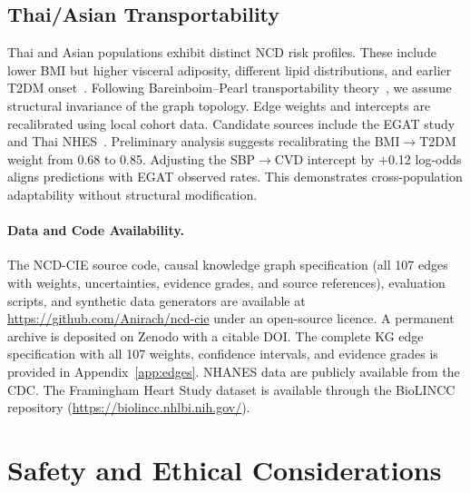 \documentclass[runningheads]{llncs}
\begin{document}
\subsection{Thai/Asian Transportability}\label{sec:thai}

Thai and Asian populations exhibit distinct NCD risk profiles.
These include lower BMI but higher visceral adiposity, different lipid
distributions, and earlier T2DM
onset~\cite{aekplakorn2011thai}.
Following Bareinboim--Pearl transportability
theory~\cite{bareinboim2016causal}, we assume structural invariance
of the graph topology.
Edge weights and intercepts are recalibrated using local cohort data.
Candidate sources include the EGAT
study~\cite{sritara2003egat} and Thai NHES~\cite{aekplakorn2011thai}.
Preliminary analysis suggests recalibrating the BMI$\rightarrow$T2DM
weight from 0.68 to 0.85.
Adjusting the SBP$\rightarrow$CVD intercept by $+$0.12 log-odds
aligns predictions with EGAT observed rates.
This demonstrates cross-population adaptability without structural
modification.

\paragraph{Data and Code Availability.}
The NCD-CIE source code, causal knowledge graph specification
(all 107 edges with weights, uncertainties, evidence grades, and
source references), evaluation scripts, and synthetic data generators
are available at \url{https://github.com/Anirach/ncd-cie}
under an open-source licence.
A permanent archive is deposited on Zenodo with a citable DOI\@.
The complete KG edge specification with all 107 weights,
confidence intervals, and evidence grades is provided in
Appendix~\ref{app:edges}.
NHANES data are publicly available from the CDC\@.
The Framingham Heart Study dataset is available through the BioLINCC
repository (\url{https://biolincc.nhlbi.nih.gov/}).

\section{Safety and Ethical Considerations}\label{sec:ethics}
\end{document}
